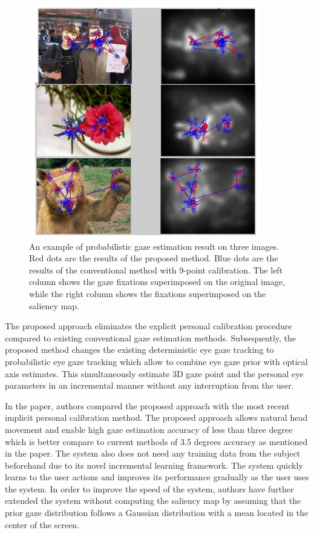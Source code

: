 \begin{figure}[!hbt]
  \centering
  \includegraphics[width=4in,height=4in]{jixu2.png}
  \caption{An example of probabilistic gaze estimation result on three images. Red dots are the results of the proposed method. Blue dots are the results of the conventional method with 9-point calibration. The left column shows the gaze fixations superimposed on the original image, while the right column shows the fixations superimposed on the saliency map.}
  \label{jix2}
\end{figure}

The proposed approach eliminates the explicit personal calibration procedure compared to existing conventional gaze estimation methods. Subsequently, the proposed method changes the existing deterministic eye gaze tracking to probabilistic eye gaze tracking which allow to combine eye gaze prior with optical axis estimates. This simultaneously estimate 3D gaze point and the personal eye parameters in an incremental manner without any interruption from the user.


In the paper, authors compared the proposed approach with the most recent implicit personal calibration method. The proposed approach allows natural head movement and enable high gaze estimation accuracy of less than three degree which is better compare to current methods of 3.5 degrees accuracy as mentioned in the paper. The system also does not need any training data from the subject beforehand due to its novel incremental learning framework. The system quickly learns to the user actions and improves its performance gradually as the user uses the system. In order to improve the speed of the system, authors have further extended the system without computing the saliency map by assuming that the prior gaze distribution follows a Gaussian distribution with a mean located in the center of the screen.


